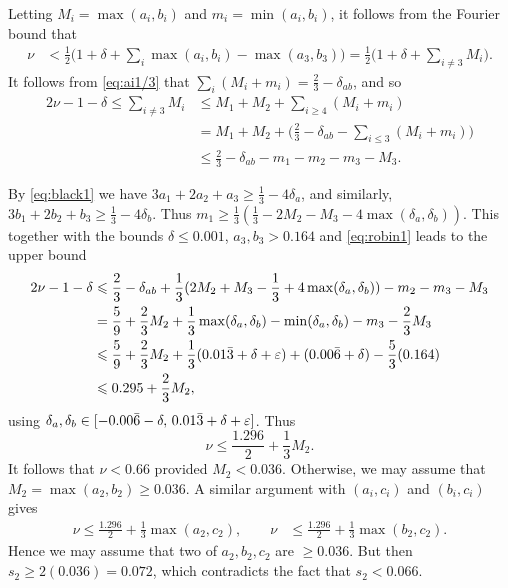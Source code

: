 Letting $M_i = \max(a_i, b_i)$ and  $m_i = \min(a_i, b_i)$, it follows from  the Fourier bound that
\begin{align*}
\nu &< \frac{1}{2}\Big(1+\delta+\sum_{i}\max(a_i, b_i) - \max(a_3,b_3)\Big) = \frac{1}{2}\Big(1+\delta+\sum_{i\neq3}M_i\Big).
\end{align*}
It follows from \eqref{eq:ai1/3} that
$\sum_i (M_i+m_i)=\frac{2}{3}-\delta_{ab}$, and so
\begin{align*}
2\nu-1 -\delta\le \sum_{i\neq3}M_i
&\le M_1+M_2 + \sum_{i\ge4}(M_i+m_i)\\
&= M_1+M_2 + \Big(\frac{2}{3} - \delta_{ab} - \sum_{i\le3}(M_i+m_i)\Big)\\
& \le \frac{2}{3} - \delta_{ab} - m_1 - m_2  - m_3 - M_3.
\end{align*}


By \eqref{eq:black1} we have $3a_1 + 2a_2 + a_3 \ge \frac{1}{3}-4\delta_a$, and similarly,
$3b_1 + 2b_2 +b_3 \ge \frac{1}{3}-4\delta_b$. Thus $m_1 \ge \frac{1}{3}(\frac{1}{3}-2M_2 - M_3-4\max(\delta_a,\delta_b))$.
This together with the bounds $\delta\leq 0.001$, $a_3,b_3>0.164$ and \eqref{eq:robin1}  leads to the upper bound
\begin{align*}
2\nu-1 -\delta
& \leqslant \frac{2}{3}
-\delta_{ab}
+ \frac{1}{3}(2M_2 + M_3-\frac{1}{3}+4\max(\delta_a,\delta_b)) - m_2 - m_3 - M_3 \\
& = \frac{5}{9} +  \frac{2}{3}M_2
+\frac{1}{3}\max(\delta_a,\delta_b)- \min(\delta_a,\delta_b)
- m_3 - \frac{2}{3}M_3  \\
&\leqslant \frac{5}{9} +  \frac{2}{3}M_2+
\frac{1}{3}(0.01\bar{3}+\delta+\varepsilon) + (0.00\bar{6}+\delta)
- \frac{5}{3}(0.164)\\
&\leqslant 0.295+\frac{2}{3}M_2,
\end{align*}
using $\delta_a,\delta_b\in [-0.00\bar{6}-\delta,\, 0.01\bar{3}+\delta+\varepsilon]$.
Thus
$$
\nu\leq \frac{1.296}{2}+\frac{1}{3}M_2.
$$
It follows that
  $\nu< 0.66$ provided $M_2 < 0.036$.
  Otherwise, we may assume that $M_2=\max(a_2,b_2) \geq  0.036$.
A similar argument with $(a_i,c_i)$ and $(b_i,c_i)$ gives
\begin{align*}
\nu
 \leq  \frac{1.296}{2}+\frac{1}{3}\max(a_2,c_2),\qquad
\nu & \leq  \frac{1.296}{2}+ \frac{1}{3}\max(b_2,c_2).
\end{align*}
Hence we may assume that two of $a_2,b_2,c_2$ are $\geq 0.036$. But then $s_2 \geq 2( 0.036) = 0.072$, which contradicts the fact that $s_2< 0.066$.

